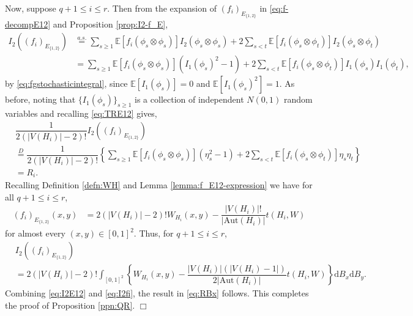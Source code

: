 \documentclass[11pt,reqno]{amsart}
\numberwithin{equation}{section}
\theoremstyle{definition}
\begin{document}
Now, suppose $q+1 \leq i \leq r$. Then from the expansion of $(f_i)_{E_{\{1, 2 \}}}$ in \eqref{eq:f-decompE12} and Proposition \ref{prop:I2-f_E},  
\begin{align*}
    I_{2}\left((f_{i})_{E_{\{1,2\}}}\right) & \stackrel{a.s.} = \sum_{s \geq 1}\mathbb{E}\left[f_{i}(\phi_{s}\otimes\phi_{s})\right] I_2(\phi_s \otimes \phi_s) + 2\sum_{s < t }\mathbb{E}\left[f_{i}(\phi_{s}\otimes\phi_{t})\right] I_2(\phi_s \otimes \phi_t) \nonumber \\ 
 & = \sum_{s \geq 1}\mathbb{E}\left[f_{i}(\phi_{s}\otimes\phi_{s})\right] \left( I_1(\phi_s)^2 -1 \right)  + 2\sum_{s < t }\mathbb{E}\left[f_{i}(\phi_{s}\otimes\phi_{t})\right] I_1(\phi_s) I_1(\phi_t) , 
    \end{align*} 
by \eqref{eq:fgstochasticintegral}, since $\mathbb E[I_1(\phi_s)] = 0$ and $\mathbb E[I_1(\phi_s)^2] = 1$. As before, noting that $\{I_1(\phi_s)\}_{s \geq 1}$ is a collection of independent $N(0, 1)$ random variables and recalling \eqref{eq:TRE12} gives, 
\begin{align}\label{eq:I2E12}
     & \dfrac{ 1 }{2(|V(H_{i})|-2)!}  I_{2}\left((f_{i})_{E_{\{1,2\}}}\right) \nonumber \\ 
     & \stackrel{D}= \dfrac{ 1 }{2(|V(H_{i})|-2)!} \left\{ \sum_{s \geq 1}\mathbb{E}\left[f_{i}(\phi_{s}\otimes\phi_{s})\right]\left(\eta_{s}^2 - 1\right) + 2\sum_{s < t }\mathbb{E}\left[f_{i} (\phi_{s}\otimes\phi_{t})\right]\eta_{s}\eta_{t} \right\} \nonumber \\ 
     & = R_i . 
\end{align}
 Recalling Definition \ref{defn:WH} and Lemma \ref{lemma:f_E12-expression} we have for all $q+1 \leq i\leq r$,
\begin{align*}
     (f_{i})_{E_{\{1,2\}}}(x,y)  
    & = 2(|V(H_{i})|-2)!W_{H_{i}}(x,y) - \dfrac{|V(H_{i})|!}{|\mathrm{Aut}(H_{i})|}t(H_{i},W)
\end{align*}
for almost every $(x,y)\in [0,1]^2$. Thus, for $q+1 \leq i\leq r$,
\begin{align}\label{eq:I2fi}
    & I_{2}\left((f_{i})_{E_{\{1,2\}}}\right) \nonumber \\ 
    & = 2(|V(H_{i})|-2)!\int_{[0, 1]^2} \left\{ W_{H_{i}}(x,y) - \dfrac{|V(H_{i})|\left(|V(H_{i})-1|\right)}{2|\mathrm{Aut}(H_{i})|}t(H_{i},W) \right\} \mathrm d B_{x}\mathrm d B_{y} . 
\end{align}
Combining \eqref{eq:I2E12} and \eqref{eq:I2fi}, the result in \eqref{eq:RBx} follows. This completes  the proof of Proposition \ref{ppn:QR}. \hfill $\Box$ 
\end{document}
